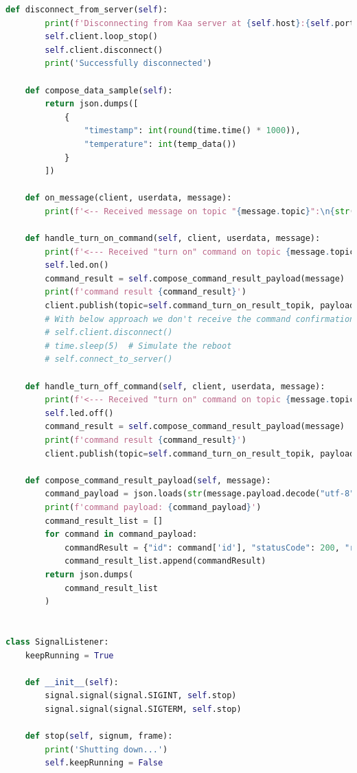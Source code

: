{\begin{lstlisting}[language=Python]
    def disconnect_from_server(self):
        print(f'Disconnecting from Kaa server at {self.host}:{self.port}...')
        self.client.loop_stop()
        self.client.disconnect()
        print('Successfully disconnected')

    def compose_data_sample(self):
        return json.dumps([
            {
                "timestamp": int(round(time.time() * 1000)),
                "temperature": int(temp_data())
            }
        ])

    def on_message(client, userdata, message):
        print(f'<-- Received message on topic "{message.topic}":\n{str(message.payload.decode("utf-8"))}')

    def handle_turn_on_command(self, client, userdata, message):
        print(f'<--- Received "turn on" command on topic {message.topic} \nTurning on...')
        self.led.on()
        command_result = self.compose_command_result_payload(message)
        print(f'command result {command_result}')
        client.publish(topic=self.command_turn_on_result_topik, payload=command_result)
        # With below approach we don't receive the command confirmation on the server side.
        # self.client.disconnect()
        # time.sleep(5)  # Simulate the reboot
        # self.connect_to_server()

    def handle_turn_off_command(self, client, userdata, message):
        print(f'<--- Received "turn on" command on topic {message.topic} \nTurning off...')
        self.led.off()
        command_result = self.compose_command_result_payload(message)
        print(f'command result {command_result}')
        client.publish(topic=self.command_turn_on_result_topik, payload=command_result)

    def compose_command_result_payload(self, message):
        command_payload = json.loads(str(message.payload.decode("utf-8")))
        print(f'command payload: {command_payload}')
        command_result_list = []
        for command in command_payload:
            commandResult = {"id": command['id'], "statusCode": 200, "reasonPhrase": "OK", "payload": "Success"}
            command_result_list.append(commandResult)
        return json.dumps(
            command_result_list
        )


class SignalListener:
    keepRunning = True

    def __init__(self):
        signal.signal(signal.SIGINT, self.stop)
        signal.signal(signal.SIGTERM, self.stop)

    def stop(self, signum, frame):
        print('Shutting down...')
        self.keepRunning = False


\end{lstlisting}}
